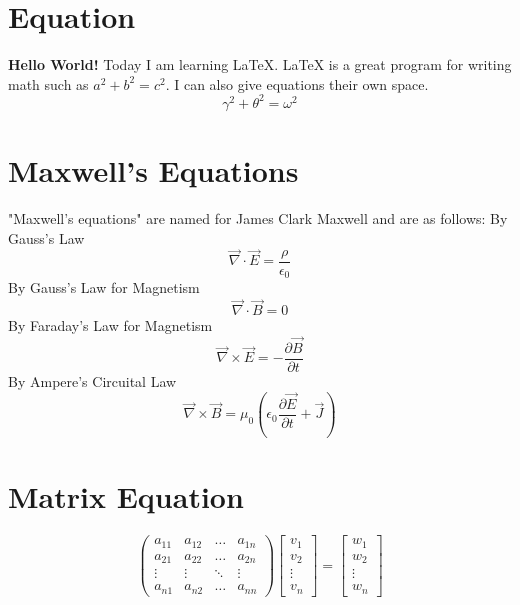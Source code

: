 \documentclass{article}
\title{}
\author{}
\date{17 April 2023}
\begin{document}
\maketitle
\section{Equation}
\textbf{Hello World!} Today I am learning \LaTeX. \LaTeX{} is a great program for writing math such as $a^2 + b^2 = c^2$. I can also give equations their own space.
\[
\gamma^2 + \theta^2 = \omega^2
\]
\section{Maxwell's Equations}
"Maxwell's equations" are named for James Clark Maxwell and are as follows:
By Gauss's Law
\begin{equation}
    \vec{\nabla} \cdot \vec{E} = \dfrac{\rho}{\epsilon_0}
\end{equation}
By Gauss's Law for Magnetism
\begin{equation}
    \vec{\nabla} \cdot \vec{B} = 0
\end{equation}
By Faraday's Law for Magnetism
\begin{equation}
    \vec{\nabla} \times \vec{E} = -\frac{\partial \vec{B}}{\partial t}
\end{equation}
By Ampere's Circuital Law
\begin{equation}
    \vec{\nabla} \times \vec{B} = \mu_0 \left(\epsilon_0 \frac{\partial \vec{E}}{\partial t} + \vec{J}\right)
\end{equation}

\section{Matrix Equation}
\begin{equation*}
\begin{pmatrix}
    a_{11} & a_{12} & \dots & a_{1n} \\
    a_{21} & a_{22} & \dots & a_{2n} \\
    \vdots & \vdots & \ddots & \vdots \\
    a_{n1} & a_{n2} & \dots & a_{nn}
\end{pmatrix}
\begin{bmatrix}
    v_{1} \\
    v_{2} \\
    \vdots \\
    v_{n}
\end{bmatrix}
=
\begin{bmatrix}
    w_{1} \\
    w_{2} \\
    \vdots \\
    w_{n}
\end{bmatrix}
\end{equation*}
\end{document}

